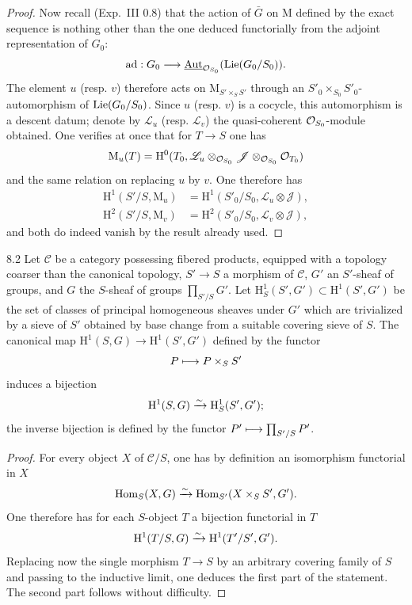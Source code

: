 \begin{proof}
Now recall (Exp.~III 0.8) that the action of $\bar G$ on $\mathrm M$ defined by the exact sequence is nothing other than the one deduced functorially from the adjoint representation of $G_0$:
\[
\operatorname{ad}:G_0\longrightarrow\underline{\operatorname{Aut}}_{\mathcal{O}_{S_0}}(\operatorname{Lie}(G_0/S_0)).
\]
The element $u$ (resp. $v$) therefore acts on $\mathrm M_{S'\times_S S'}$ through an $S'_0\times_{S_0}S'_0$-automorphism of $\operatorname{Lie}(G_0/S_0)$. Since $u$ (resp. $v$) is a cocycle, this automorphism is a descent datum; denote by $\mathscr L_u$ (resp. $\mathscr L_v$) the quasi-coherent $\mathcal{O}_{S_0}$-module obtained. One verifies at once that for $T\to S$ one has
\[
\mathrm M_u(T)=\mathrm H^0(T_0,\mathscr L_u\otimes_{\mathcal{O}_{S_0}}\mathscr J\otimes_{\mathcal{O}_{S_0}}\mathcal{O}_{T_0})
\]
and the same relation on replacing $u$ by $v$. One therefore has
\[
\begin{aligned}
\mathrm H^1(S'/S,\mathrm M_u)&=\mathrm H^1(S'_0/S_0,\mathscr L_u\otimes\mathscr J),\\
\mathrm H^2(S'/S,\mathrm M_v)&=\mathrm H^2(S'_0/S_0,\mathscr L_v\otimes\mathscr J),
\end{aligned}
\]
and both do indeed vanish by the result already used.
\end{proof}
\begin{proposition}{8.2}\label{XXIV.8.2}
Let $\mathscr C$ be a category possessing fibered products, equipped with a topology coarser than the canonical topology, $S'\to S$ a morphism of $\mathscr C$, $G'$ an $S'$-sheaf of groups, and $G$ the $S$-sheaf of groups $\prod_{S'/S}G'$. Let $\mathrm H^1_S(S',G')\subset\mathrm H^1(S',G')$ be the set of classes of principal homogeneous sheaves under $G'$ which are trivialized by a sieve of $S'$ obtained by base change from a suitable covering sieve of $S$. The canonical map $\mathrm H^1(S,G)\to\mathrm H^1(S',G')$ defined by the functor
\[
P\longmapsto P\times_S S'
\]
induces a bijection
\[
\mathrm H^1(S,G)\xrightarrow{\sim}\mathrm H^1_S(S',G');
\]
the inverse bijection is defined by the functor $P'\longmapsto\prod_{S'/S}P'$.
\end{proposition}
\begin{proof}
For every object $X$ of $\mathscr C/S$, one has by definition an isomorphism functorial in $X$
\[
\operatorname{Hom}_S(X,G)\xrightarrow{\sim}\operatorname{Hom}_{S'}(X\times_S S',G').
\]
One therefore has for each $S$-object $T$ a bijection functorial in $T$
\[
\mathrm H^1(T/S,G)\xrightarrow{\sim}\mathrm H^1(T'/S',G').
\]
Replacing now the single morphism $T\to S$ by an arbitrary covering family of $S$ and passing to the inductive limit, one deduces the first part of the statement. The second part follows without difficulty.
\end{proof}
